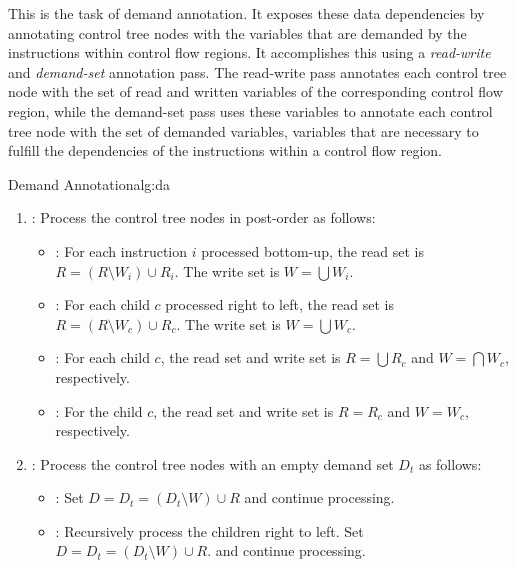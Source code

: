 This is the task of demand annotation. It exposes these data dependencies by annotating control
tree nodes with the variables that are demanded by the instructions within control flow regions.
It accomplishes this using a \emph{read-write} and \emph{demand-set} annotation pass.
The read-write pass annotates each control tree node with the set of read and written variables of
the corresponding control flow region, while the demand-set pass uses these variables
to annotate each control tree node with the set of demanded variables, \ie variables that are
necessary to fulfill the dependencies of the instructions within a control flow region.

\begin{informalg}{Demand Annotation}{alg:da}
\begin{enumerate}
	\vspace*{-0.7\baselineskip}

	\item {}: Process the control tree nodes in post-order as follows:
		\begin{itemize}
			\item {}: For each instruction $i$ processed bottom-up, the read set is
				$R = (R \setminus W_i) \cup R_i$. The write set is $W = \bigcup W_i$.

			\item {}: For each child $c$ processed right to left, the read set is
				$R = (R \setminus W_c) \cup R_c$. The write set is $W = \bigcup W_c$.

			\item {}: For each child $c$, the read set and write set is
				$R = \bigcup R_c$ and $W = \bigcap W_c$, respectively.

			\item {}: For the child $c$, the read set and write set is $R = R_c$ and
				$W = W_c$, respectively.
		\end{itemize}

	\item {}: Process the control tree nodes with an empty demand set
		$D_t$ as follows:
		\begin{itemize}
			\item {}: Set $D = D_t = (D_t \setminus W) \cup R$ and continue processing.

			\item {}: Recursively process the children right to left.
				Set $D = D_t = (D_t \setminus W) \cup R$. and continue processing.


\end{itemize}
\end{enumerate}
\end{informalg}
